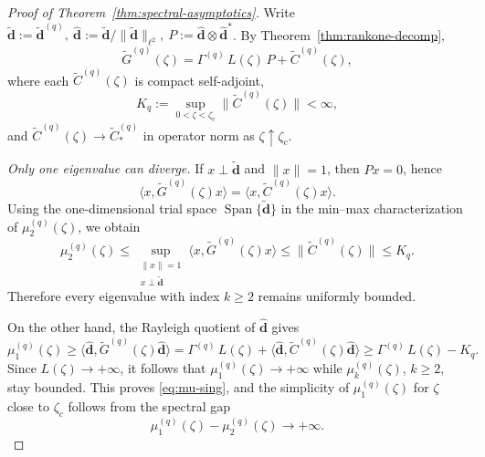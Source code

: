 \documentclass[11pt]{amsart}
\numberwithin{equation}{section}
\theoremstyle{plain}
\theoremstyle{definition}
\theoremstyle{remark}
\DeclareMathOperator{\Span}{Span}
\begin{document}
\begin{proof}[Proof of Theorem~\ref{thm:spectral-asymptotics}]
	Write $
		\widetilde{\bm d}:=\widetilde{\bm d}^{(q)},
		\
		\widehat{\bm d}:=\widetilde{\bm d}/\|\widetilde{\bm d}\|_{\ell^2},
		\
		P:=\widehat{\bm d}\otimes\widehat{\bm d}^{*}$. By Theorem~\ref{thm:rankone-decomp},
	\begin{equation}\label{eq:G-rankone-tight}
		\widetilde G^{(q)}(\zeta)
		=
		\Gamma^{(q)}\,L(\zeta)\,P+\widetilde C^{(q)}(\zeta),
	\end{equation}
	where each \(\widetilde C^{(q)}(\zeta)\) is compact self-adjoint,
	\[
		K_q:=\sup_{0<\zeta<\zeta_c}\|\widetilde C^{(q)}(\zeta)\|<\infty,
	\]
	and $\widetilde C^{(q)}(\zeta)\to \widetilde C_*^{(q)}$
		in operator norm as $\zeta\uparrow\zeta_c$.

	\smallskip
	\noindent\emph{Only one eigenvalue can diverge.}
	If \(x\perp\widetilde{\bm d}\) and \(\|x\|=1\), then \(Px=0\), hence
	\[
		\langle x,\widetilde G^{(q)}(\zeta)x\rangle
		=
		\langle x,\widetilde C^{(q)}(\zeta)x\rangle.
	\]
	Using the one-dimensional trial space \(\Span\{\widetilde{\bm d}\}\) in the
	min--max characterization of \(\mu_2^{(q)}(\zeta)\), we obtain
	\begin{equation}\label{eq:mu2-bound-tight}
		\mu_2^{(q)}(\zeta)
		\le
		\sup_{\substack{\|x\|=1\\x\perp\widetilde{\bm d}}}
		\langle x,\widetilde G^{(q)}(\zeta)x\rangle
		\le
		\|\widetilde C^{(q)}(\zeta)\|
		\le K_q.
	\end{equation}
	Therefore every eigenvalue with index \(k\ge2\) remains uniformly bounded.

	On the other hand, the Rayleigh quotient of \(\widehat{\bm d}\) gives
	\[
		\mu_1^{(q)}(\zeta)
		\ge
		\langle \widehat{\bm d},\widetilde G^{(q)}(\zeta)\widehat{\bm d}\rangle
		=
		\Gamma^{(q)}\,L(\zeta)
		+
		\langle \widehat{\bm d},
		\widetilde C^{(q)}(\zeta)\widehat{\bm d}\rangle
		\ge
		\Gamma^{(q)}\,L(\zeta)-K_q.
	\]
	Since \(L(\zeta)\to+\infty\), it follows that \(\mu_1^{(q)}(\zeta)\to+\infty\)
	while \(\mu_k^{(q)}(\zeta)\), \(k\ge2\), stay bounded. This proves
	\eqref{eq:mu-sing}, and the simplicity of \(\mu_1^{(q)}(\zeta)\) for
	\(\zeta\) close to \(\zeta_c\) follows from the spectral gap
	\[
		\mu_1^{(q)}(\zeta)-\mu_2^{(q)}(\zeta)\to+\infty.
	\]


\end{proof}
\end{document}
